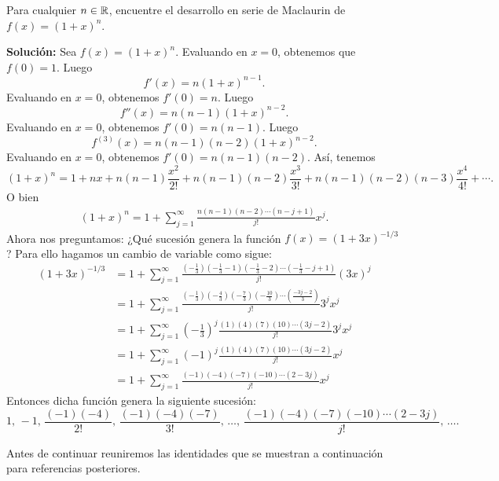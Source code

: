 \begin{myexample}
	Para cualquier $n \in \RR$, encuentre el desarrollo en serie de Maclaurin de $f(x) = (1 + x)^n$.

	\tcblower
	\textbf{\color{jblueleft}Solución:} Sea $f(x) = (1 + x)^n$. Evaluando en $x = 0$, obtenemos que $f(0) = 1$. Luego
	$$f'(x) = n(1 + x)^{n-1}.$$
	Evaluando en $x = 0$, obtenemos $f'(0) = n$. Luego
	$$f''(x) = n(n - 1)(1 + x)^{n-2}.$$
	Evaluando en $x = 0$, obtenemos $f'(0) = n(n - 1)$. Luego
	$$f^{(3)}(x) = n(n - 1)(n - 2)(1 + x)^{n-2}.$$
	Evaluando en $x = 0$, obtenemos $f'(0) = n(n - 1)(n - 2)$. Así, tenemos
	$$(1 + x)^n = 1 + nx + n(n-1) \frac{x^2}{2!} + n(n - 1)(n - 2) \frac{x^3}{3!} + n(n - 1)(n - 2)(n - 3) \frac{x^4}{4!} + \cdots.$$
	O bien
	\begin{align*}
		(1 + x)^n = 1 + \sum_{j=1}^{\infty} \frac{n(n - 1)(n - 2) \cdots (n - j + 1)}{j!} x^j.
	\end{align*}
	Ahora nos preguntamos: ¿Qué sucesión genera la función $f(x) = (1 + 3x)^{-1/3}$? Para ello hagamos un cambio de variable como sigue:
	\begin{align*}
		(1 + 3x)^{-1/3} & = 1 + \sum_{j=1}^{\infty} \frac{\displaystyle \left(-\frac{1}{3}\right)\left(-\frac{1}{3} - 1\right)\left(-\frac{1}{3} - 2\right) \cdots \left(-\frac{1}{3} - j + 1\right)}{j!} (3x)^j \\
		& = 1 + \sum_{j=1}^{\infty} \frac{\displaystyle \left(-\frac{1}{3}\right)\left(-\frac{4}{3}\right)\left(-\frac{7}{3}\right)\left(-\frac{10}{3}\right) \cdots \left(\frac{-3j-2}{3}\right)}{j!} 3^j x^j \\
		& = 1 + \sum_{j=1}^{\infty} \left(- \frac{1}{3} \right)^j \frac{(1)(4)(7)(10) \cdots (3j - 2)}{j!} 3^j x^j \\
		& = 1 + \sum_{j=1}^{\infty} (-1)^j \frac{(1)(4)(7)(10) \cdots (3j - 2)}{j!} x^j \\
		& = 1 + \sum_{j=1}^{\infty} \frac{(-1)(-4)(-7)(-10) \cdots (2 - 3j)}{j!} x^j
	\end{align*}
	Entonces dicha función genera la siguiente sucesión:
    $$1, \, -1, \, \frac{(-1)(-4)}{2!}, \, \frac{(-1)(-4)(-7)}{3!}, \, \dots, \, \frac{(-1)(-4)(-7)(-10) \cdots (2-3j)}{j!}, \, \dots.$$
\end{myexample}

Antes de continuar reuniremos las identidades que se muestran a continuación para referencias posteriores.

